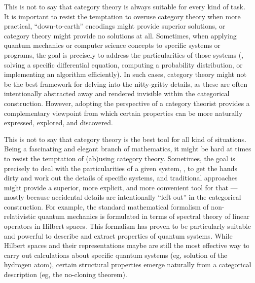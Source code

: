 This is not to say that category theory is always suitable for every kind of task. 
It is important to resist the temptation to overuse category theory when more practical, ``down-to-earth'' encodings might provide superior solutions, or category theory might provide no solutions at all.
Sometimes, when applying quantum mechanics or computer science concepts to specific systems or programs, the goal is precisely to address the particularities of those systems (\eg, solving a specific differential equation, computing a probability distribution, or implementing an algorithm efficiently).
In such cases, category theory might not be the best framework for delving into the nitty-gritty details, as these are often intentionally abstracted away and rendered invisible within the categorical construction. 
However, adopting the perspective of a category theorist provides a complementary viewpoint from which certain properties can be more naturally expressed, explored, and discovered.

This is not to say that category theory is the best tool for all kind of situations. Being a fascinating and elegant branch of mathematics, it might be hard at times to resist the temptation of (ab)using category theory.  
Sometimes, the goal is precisely to deal with the particularities of a given system, \ie, to get the hands dirty and work out the details of specific systems, and traditional approaches might provide a superior, more explicit, and more convenient tool for that --- mostly because accidental details are intentionally ``left out'' in the categorical construction. 
For example, the standard mathematical formalism of non-relativistic quantum mechanics is formulated in terms of spectral theory of linear operators in Hilbert spaces. This formalism has proven to be particularly suitable and powerful to describe and extract properties of quantum systems. While Hilbert spaces and their representations maybe are still the most effective way to carry out calculations about specific quantum systems (eg, solution of the hydrogen atom), certain structural properties emerge naturally from a categorical description (eg, the no-cloning theorem). 

\smallskip

\noindent\textsw{\myLocation, \myTime}


\begin{flushright}
        \myName
\end{flushright}

